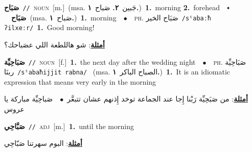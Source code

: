 \documentclass[10pt,a4paper,twoside]{article} %
\begin{document}
\begin{multicols}{2}
{{{{{\setlength\topsep{0pt}\textbf{\foreignlanguage{arabic}{صَبَاح}}\ {\color{gray}\texttt{//}\color{black}}\ \textsc{noun}\ [m.]\ \color{gray}(msa. \foreignlanguage{arabic}{جَبين}~\foreignlanguage{arabic}{\textbf{٢.}}  \foreignlanguage{arabic}{صَباح}~\foreignlanguage{arabic}{\textbf{١.}})\color{black}\ \textbf{1.}~morning  \textbf{2.}~forehead\ \ $\smblkdiamond$\ \ \setlength\topsep{0pt}\textbf{\foreignlanguage{arabic}{صَبَاح}}\ \color{gray}(msa. \foreignlanguage{arabic}{صَباح}~\foreignlanguage{arabic}{\textbf{١.}})\color{black}\ \textbf{1.}~morning\ \ $\bullet$\ \ \textsc{ph.} \color{gray} \foreignlanguage{arabic}{صَبَاح الخير}\color{black}\ {\color{gray}\texttt{/{\sffamily sˤabaːħ ʔilxeːr}/}\color{black}}\ \textbf{1.}~Good morning!\  \begin{flushright}\color{gray}\foreignlanguage{arabic}{\textbf{\underline{\foreignlanguage{arabic}{أمثلة}}}: شو هاللطعة اللي عصَباحك؟}\end{flushright}\color{black}} \vspace{2mm}

{\setlength\topsep{0pt}\textbf{\foreignlanguage{arabic}{صَبَاحِيِّة}}\ {\color{gray}\texttt{//}\color{black}}\ \textsc{noun}\ [f.]\ \textbf{1.}~the next day after the wedding night\ \ $\bullet$\ \ \textsc{ph.} \color{gray} \foreignlanguage{arabic}{صَبَاحِيِّة ربنَا}\color{black}\ {\color{gray}\texttt{/{\sffamily sˤabaħijjit rabna}/}\color{black}}\ \color{gray} (msa. \foreignlanguage{arabic}{الصباح الباكر}~\foreignlanguage{arabic}{\textbf{١.}})\color{black}\ \textbf{1.}~It is an idiomatic expression that means very early in the morning\  \begin{flushright}\color{gray}\foreignlanguage{arabic}{\textbf{\underline{\foreignlanguage{arabic}{أمثلة}}}: من صَبَحِيِّة رَبْنا إِجا عند الجماعة توخد إِذنهم عشان تتبعَّر\ $\bullet$\ \  صَباحِيِّة مباركة يا عروس}\end{flushright}\color{black}} \vspace{2mm}

{\setlength\topsep{0pt}\textbf{\foreignlanguage{arabic}{صَبَّاحِي}}\ {\color{gray}\texttt{//}\color{black}}\ \textsc{adj}\ [m.]\ \textbf{1.}~until the morning\  \begin{flushright}\color{gray}\foreignlanguage{arabic}{\textbf{\underline{\foreignlanguage{arabic}{أمثلة}}}: البوم سهرتنا صَبّاحِي}\end{flushright}\color{black}} \vspace{2mm}

}}}}
\end{multicols}
\end{document}
